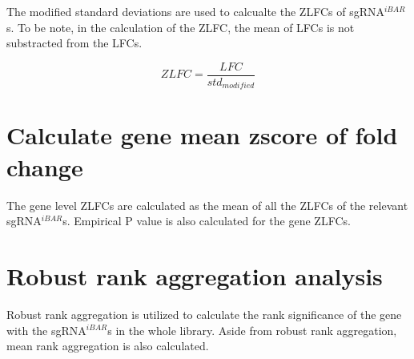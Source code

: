 \documentclass[11pt, a4paper]{article}
\begin{document}
The modified standard deviations are used to calcualte the ZLFCs of
sgRNA$^{iBAR}$s. To be note, in the calculation of the ZLFC, the mean of
LFCs is not substracted from the LFCs.

$$ZLFC = \frac{LFC}{std_{modified}}$$


\section{Calculate gene mean zscore of fold change}

The gene level ZLFCs are calculated as the mean of all the ZLFCs of
the relevant sgRNA$^{iBAR}$s. Empirical P value is also calculated for the
gene ZLFCs.

\section{Robust rank aggregation analysis}


Robust rank aggregation \citep{kolde_robust_2012} is utilized to
calculate the rank significance of the gene with the sgRNA$^{iBAR}$s
in the whole library. Aside from robust rank aggregation, mean rank
aggregation is also calculated.


\end{document}
